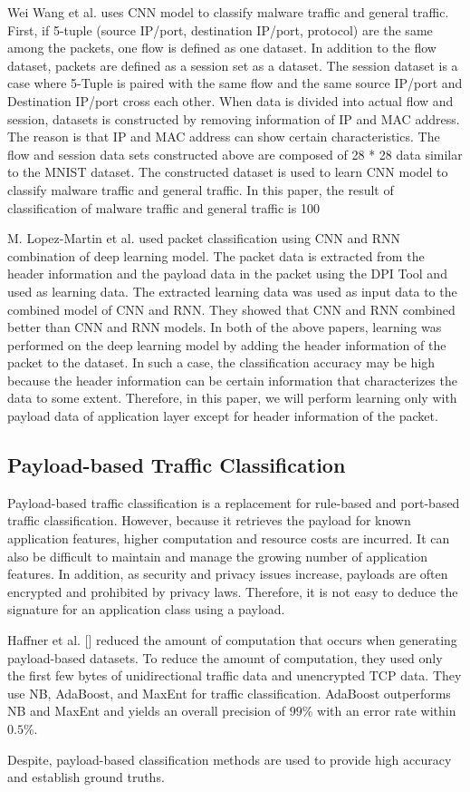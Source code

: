 Wei Wang et al. uses CNN model to classify malware traffic and general traffic.
First, if 5-tuple (source IP/port, destination IP/port, protocol) are the same among the packets, one flow is defined as one dataset.
In addition to the flow dataset, packets are defined as a session set as a dataset.
The session dataset is a case where 5-Tuple is paired with the same flow and the same source IP/port and Destination IP/port cross each other.
When data is divided into actual flow and session, datasets is constructed by removing information of IP and MAC address.
The reason is that IP and MAC address can show certain characteristics.
The flow and session data sets constructed above are composed of 28 * 28 data similar to the MNIST dataset.
The constructed dataset is used to learn CNN model to classify malware traffic and general traffic.
In this paper, the result of classification of malware traffic and general traffic is 100%

M. Lopez-Martin et al. used packet classification using CNN and RNN combination of deep learning model. The packet data is extracted from the header information and the payload data in the packet using the DPI Tool and used as learning data. The extracted learning data was used as input data to the combined model of CNN and RNN. They showed that CNN and RNN combined better than CNN and RNN models.
In both of the above papers, learning was performed on the deep learning model by adding the header information of the packet to the dataset. In such a case, the classification accuracy may be high because the header information can be certain information that characterizes the data to some extent. Therefore, in this paper, we will perform learning only with payload data of application layer except for header information of the packet.

\subsection{Payload-based Traffic Classification}\label{subsec:payloadbased}
Payload-based traffic classification is a replacement for rule-based and port-based traffic classification.
However, because it retrieves the payload for known application features, higher computation and resource costs are incurred.
It can also be difficult to maintain and manage the growing number of application features.
In addition, as security and privacy issues increase, payloads are often encrypted and prohibited by privacy laws.
Therefore, it is not easy to deduce the signature for an application class using a payload.

Haffner et al. [] reduced the amount of computation that occurs when generating payload-based datasets.
To reduce the amount of computation, they used only the first few bytes of unidirectional traffic data and unencrypted TCP data.
They use NB, AdaBoost, and MaxEnt for traffic classification.
AdaBoost outperforms NB and MaxEnt and yields an overall precision of $99\%$ with an error rate within $0.5\%$.

Despite, payload-based classification methods are used to provide high accuracy and establish ground truths.